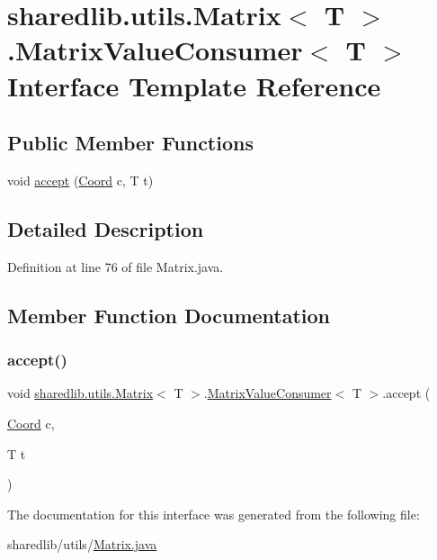 \hypertarget{interfacesharedlib_1_1utils_1_1_matrix_1_1_matrix_value_consumer}{}\section{sharedlib.\+utils.\+Matrix$<$ T $>$.Matrix\+Value\+Consumer$<$ T $>$ Interface Template Reference}
\label{interfacesharedlib_1_1utils_1_1_matrix_1_1_matrix_value_consumer}
\subsection*{Public Member Functions}
\begin{DoxyCompactItemize}
\item 
void \hyperlink{interfacesharedlib_1_1utils_1_1_matrix_1_1_matrix_value_consumer_ae8a30a6539e80f7c9686a65c1b420a18}{accept} (\hyperlink{classsharedlib_1_1utils_1_1_coord}{Coord} c, T t)
\end{DoxyCompactItemize}


\subsection{Detailed Description}


Definition at line 76 of file Matrix.\+java.



\subsection{Member Function Documentation}
\hypertarget{interfacesharedlib_1_1utils_1_1_matrix_1_1_matrix_value_consumer_ae8a30a6539e80f7c9686a65c1b420a18}{}\label{interfacesharedlib_1_1utils_1_1_matrix_1_1_matrix_value_consumer_ae8a30a6539e80f7c9686a65c1b420a18} 
\subsubsection{\texorpdfstring{accept()}{accept()}}
{\footnotesize\ttfamily void \hyperlink{classsharedlib_1_1utils_1_1_matrix}{sharedlib.\+utils.\+Matrix}$<$ T $>$.\hyperlink{interfacesharedlib_1_1utils_1_1_matrix_1_1_matrix_value_consumer}{Matrix\+Value\+Consumer}$<$ T $>$.accept (\begin{DoxyParamCaption}\item[{\hyperlink{classsharedlib_1_1utils_1_1_coord}{Coord}}]{c,  }\item[{T}]{t }\end{DoxyParamCaption})}



The documentation for this interface was generated from the following file\+:\begin{DoxyCompactItemize}
\item 
sharedlib/utils/\hyperlink{_matrix_8java}{Matrix.\+java}\end{DoxyCompactItemize}
